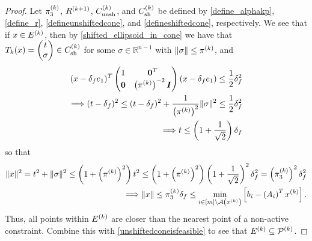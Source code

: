 \begin{proof}



Let $\pi_3^{(k)}$, ${R^{(k+1)}}$, ${C^{(k)}_{\textrm{unsh}}}$, and ${C^{(k)}_{\textrm{sh}}}$ be defined by
\cref{define_alphakp}, \cref{define_r}, \cref{defineunshiftedcone}, and \cref{defineshiftedcone},
respectively.
We see that if $x \in {E^{(k)}}$,
then by \cref{shifted_ellipsoid_in_cone} we have that $T_k(x) = \begin{pmatrix}t\\ \sigma\end{pmatrix} \in {C^{(k)}_{\textrm{sh}}}$ for some $\sigma \in \mathbb R^{n-1}$
with $\left\|\sigma\right\| \le \pi^{(k)}$, and
\begin{align*}
(x - \delta_{f} e_1)^T\begin{pmatrix}
1 & \boldsymbol0^T \\
\boldsymbol 0 & \left(\pi^{(k)}\right)^{-2} \boldsymbol I \\
\end{pmatrix}(x - \delta_{f} e_1) \le \frac 1 2 \delta_{f}^2 \\
\Longrightarrow (t - \delta_{f})^2 \le (t - \delta_{f})^2 + \frac {1} {\left(\pi^{(k)}\right)^2} \|\sigma\|^2 \le \frac 1 2 \delta_{f}^2 \\
\Longrightarrow t \le \left(1 + \frac 1 {\sqrt{2}}\right) \delta_{f}
\end{align*}
so that 
\begin{align*}
\|x\|^2 = t^2 + \|\sigma\|^2 \le \left(1 + \left(\pi^{(k)}\right)^2 \right) t^2 
\le \left(1 + \left(\pi^{(k)}\right)^2 \right) \left(1 + \frac 1 {\sqrt{2}}\right)^2 \delta_{f}^2 
= \left(\pi_3^{(k)}\right)^2 \delta_{f}^2 \\
\Longrightarrow \|x\| \le \pi_3^{(k)} \delta_{f} \le \min_{i \in [m] \setminus {\mathcal A}\left(x^{(k)}\right)} \left[{{b}}_i - \left({{A}}_i\right)^Tx^{(k)}\right].
\end{align*}
Thus, all points within ${E^{(k)}}$ are closer than the nearest point of a non-active constraint.
Combine this with \cref{unshiftedconeisfeasible} to see that ${E^{(k)}} \subseteq {{\mathcal{P}}^{(k)}}$.
\end{proof}




